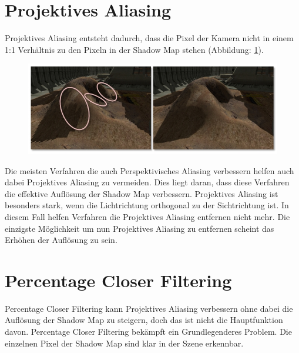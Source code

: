 \section{Projektives Aliasing}
\label{section:projective-aliasing}
Projektives Aliasing entsteht dadurch, dass die Pixel der Kamera nicht in 
einem 1:1 Verhältnis zu den Pixeln in der Shadow Map stehen (Abbildung: \ref{fig:projective-aliasing}).
\begin{figure}
	\begin{center}
		\includegraphics[width=1\textwidth]{res/img/projective-aliasing/image.jpg}
    \caption{}
	\end{center}
	\label{fig:projective-aliasing}
\end{figure}
\newline \newline
Die meisten Verfahren die auch Perspektivisches Aliasing verbessern helfen auch dabei Projektives Aliasing zu vermeiden.
Dies liegt daran, dass diese Verfahren die effektive Auflösung der Shadow Map verbessern.
Projektives Aliasing ist besonders stark, wenn die Lichtrichtung orthogonal zu der Sichtrichtung ist.
In diesem Fall helfen Verfahren die Projektives Aliasing entfernen nicht mehr.
Die einzigste Möglichkeit um nun Projektives Aliasing zu entfernen scheint das Erhöhen der Auflösung zu sein.
\section{Percentage Closer Filtering}
\label{section:pcf}
Percentage Closer Filtering kann Projektives Aliasing verbessern ohne dabei die Auflösung der Shadow Map zu steigern, 
doch das ist nicht die Hauptfunktion davon.
Percentage Closer Filtering bekämpft ein Grundlegenderes Problem.
Die einzelnen Pixel der Shadow Map sind klar in der Szene erkennbar.

